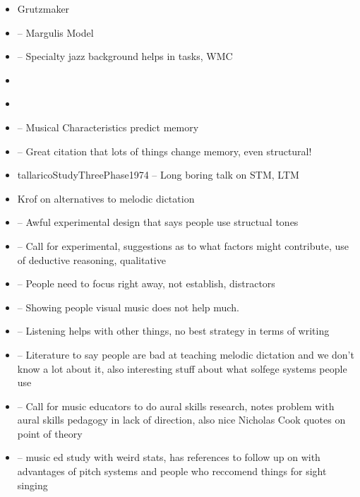 \documentclass[]{book}
\providecommand{\tightlist}{%
  \setlength{\itemsep}{0pt}\setlength{\parskip}{0pt}}
\begin{document}
\begin{itemize}
\tightlist
\item
  Grutzmaker
\item
  \citep{margulisModelMelodicExpectation2005} -- Margulis Model
\item
  \citep{nicholsScoreOneJazz2018} -- Specialty jazz background helps in tasks, WMC
\item
  \citep{schumannMusikalischeHausundLebensRegeln1860}
\item
  \citep{smithSolfegeEssentialMusicianship1934}
\item
  \citep{longRelationshipsPitchMemory1977} -- Musical Characteristics predict memory
\item
  \citep{taylorStrategiesMemoryShort1983} -- Great citation that lots of things change memory, even structural!
\item
  tallaricoStudyThreePhase1974 -- Long boring talk on STM, LTM
\item
  Krof on alternatives to melodic dictation
\item
  \citep{ouraConstructingRepresentationMelody1991a} -- Awful experimental design that says people use structual tones
\item
  \citep{buonviriExplorationUndergraduateMusic2014} -- Call for experimental, suggestions as to what factors might contribute, use of deductive reasoning, qualitative
\item
  \citep{buonviriEffectsPreparatorySinging2015} -- People need to focus right away, not establish, distractors
\item
  \citep{buonviriEffectsMusicNotation2015} -- Showing people visual music does not help much.
\item
  \citep{buonviriEffectsTwoListening2017} -- Listening helps with other things, no best strategy in terms of writing
\item
  \citep{buonviriMelodicDictationInstruction2015} -- Literature to say people are bad at teaching melodic dictation and we don't know a lot about it, also interesting stuff about what solfege systems people use
\item
  \citep{davidbutlerWhyGulfMusic1997a} -- Call for music educators to do aural skills research, notes problem with aural skills pedagogy in lack of direction, also nice Nicholas Cook quotes on point of theory
\item
  \citep{furbyEffectsPeerTutoring2016} -- music ed study with weird stats, has references to follow up on with advantages of pitch systems and people who reccomend things for sight singing

\end{itemize}
\end{document}
